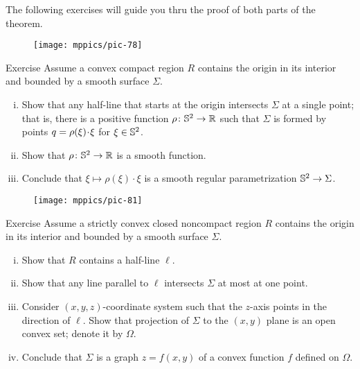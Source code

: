 The following exercises will guide you thru the proof of both parts of the theorem.

\begin{wrapfigure}{O}{33 mm}
\vskip-0mm
\centering
\texttt{[image: mppics/pic-78]}
\vskip-0mm
\end{wrapfigure}

\begin{thm}{Exercise}
Assume a convex compact region $R$ contains the origin in its interior and bounded by a smooth surface $\Sigma$.

\begin{enumerate}[(i)]
\item Show that any half-line that starts at the origin intersects $\Sigma$ at a single point;
that is, there is a positive function $\rho\:\SS^2\z\to\RR$ such that $\Sigma$ is formed by points $q\z=\rho(\xi)\cdot \xi$ for $\xi\in \mathbb{S}^2$.
\item Show that $\rho\colon\mathbb{S}^2\to\mathbb{R}$ is a smooth function.
\item Conclude that $\xi\mapsto \rho(\xi)\cdot \xi$ is a smooth regular parametrization $\mathbb{S}^2\to \Sigma$.
\end{enumerate}
\end{thm}

\begin{wrapfigure}[15]{o}{28 mm}
\vskip-0mm
\centering
\texttt{[image: mppics/pic-81]}
\vskip-0mm
\end{wrapfigure} %

\begin{thm}{Exercise}
Assume a strictly convex closed noncompact region $R$ contains the origin in its interior and bounded by a smooth surface $\Sigma$.

\begin{enumerate}[(i)]
\item Show that $R$ contains a half-line $\ell$.
\item Show that any line parallel to $\ell$ intersects $\Sigma$ at most at one point.
\item Consider $(x,y,z)$-coordinate system such that the $z$-axis points in the direction of $\ell$.
Show that projection of $\Sigma$ to the $(x,y)$ plane is an open convex set; denote it by $\Omega$.
\item Conclude that $\Sigma$ is a graph $z=f(x,y)$ of a convex function $f$ defined on $\Omega$. 
\end{enumerate}

\end{thm}

